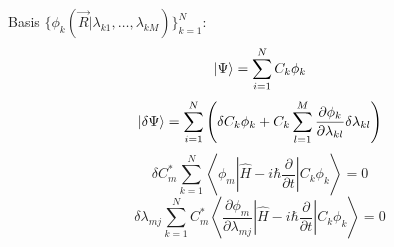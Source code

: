 \begin{frame}{}
\begin{block}{Basis $\{\phi_k(\vec{R}|\lambda_{k1},\ldots,\lambda_{kM})\}_{k=1}^N$: }
$$\left| \Psi \right\rangle=\sum_{i=1}^N C_k\phi_k$$
$$\left| \delta\Psi \right\rangle=\sum_{i=1}^N\left( \delta C_k \phi_k + C_k\sum_{l=1}^M\frac{\partial\phi_k}{\partial\lambda_{kl}}\delta\lambda_{kl} \right)$$
$$\delta C_m^*\sum_{k=1}^N\left\langle\phi_m\left|\hat{H}-i\hbar\frac{\partial}{\partial t}\right|C_k\phi_k\right\rangle=0$$
$$\delta\lambda_{mj}\sum_{k=1}^NC_m^*\left\langle\frac{\partial\phi_m}{\partial\lambda_{mj}}\left|\hat{H}-i\hbar\frac{\partial}{\partial t}\right|C_k\phi_k\right\rangle = 0$$
\end{block}
\end{frame}



